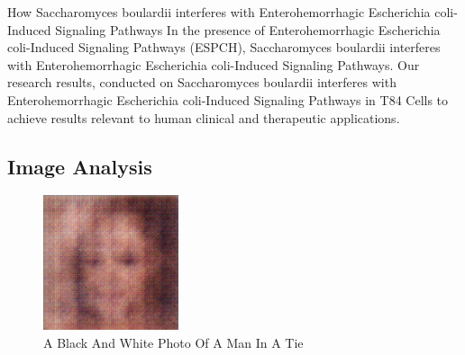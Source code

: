 \documentclass{article}%
\begin{document}
How Saccharomyces boulardii interferes with Enterohemorrhagic Escherichia coli{-}Induced Signaling Pathways\newline%
In the presence of Enterohemorrhagic Escherichia coli{-}Induced Signaling Pathways (ESPCH), Saccharomyces boulardii interferes with Enterohemorrhagic Escherichia coli{-}Induced Signaling Pathways.\newline%
Our research results, conducted on Saccharomyces boulardii interferes with Enterohemorrhagic Escherichia coli{-}Induced Signaling Pathways in T84 Cells to achieve results relevant to human clinical and therapeutic applications.

%
\subsection{Image Analysis}%
\label{subsec:ImageAnalysis}%


\begin{figure}[h!]%
\centering%
\includegraphics[width=150px]{500_fake_images/samples_5_341.png}%
\caption{A Black And White Photo Of A Man In A Tie}%
\end{figure}

%
\end{document}

